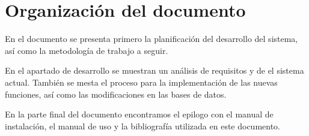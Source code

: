 \section{Organización del documento}

En el documento se presenta primero la planificación del desarrollo del sistema, así como la metodología de trabajo a seguir.
\newline

En el apartado de desarrollo se muestran un análisis de requisitos y de el sistema actual. También se mesta el proceso para la implementación de las nuevas funciones, así como las modificaciones en las bases de datos.
\newline

En la parte final del documento encontramos el epilogo con el manual de instalación, el manual de uso y la bibliografía utilizada en este documento.



